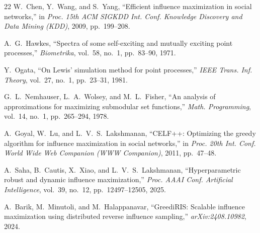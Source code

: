 \documentclass[10pt,conference]{IEEEtran}
\begin{document}
\begin{thebibliography}{22}
W.~Chen, Y.~Wang, and S.~Yang,
``Efficient influence maximization in social networks,''
in \textit{Proc. 15th ACM SIGKDD Int. Conf. Knowledge Discovery and Data Mining (KDD)}, 2009, pp.~199--208.

A.~G.~Hawkes,
``Spectra of some self-exciting and mutually exciting point processes,''
\textit{Biometrika}, vol.~58, no.~1, pp.~83--90, 1971.

Y.~Ogata,
``On Lewis' simulation method for point processes,''
\textit{IEEE Trans. Inf. Theory}, vol.~27, no.~1, pp.~23--31, 1981.

G.~L.~Nemhauser, L.~A.~Wolsey, and M.~L.~Fisher,
``An analysis of approximations for maximizing submodular set functions,''
\textit{Math. Programming}, vol.~14, no.~1, pp.~265--294, 1978.

A.~Goyal, W.~Lu, and L.~V.~S.~Lakshmanan,
``CELF++: Optimizing the greedy algorithm for influence maximization in social networks,''
in \textit{Proc. 20th Int. Conf. World Wide Web Companion (WWW Companion)}, 2011, pp.~47--48.

A.~Saha, B.~Cautis, X.~Xiao, and L.~V.~S.~Lakshmanan,
``Hyperparametric robust and dynamic influence maximization,''
\textit{Proc. AAAI Conf. Artificial Intelligence}, vol.~39, no.~12, pp.~12497--12505, 2025.

A.~Barik, M.~Minutoli, and M.~Halappanavar,
``GreediRIS: Scalable influence maximization using distributed reverse influence sampling,''
\textit{arXiv:2408.10982}, 2024.

\end{thebibliography}
\end{document}
